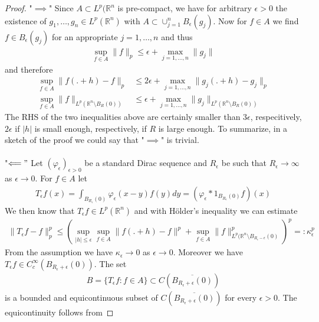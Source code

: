 \documentclass[11pt,a4paper]{article}
\theoremstyle{definition}
\begin{document}
\begin{proof}
"$\implies$" Since $A \subset L^p( \mathbb{R}^n$ is pre-compact, we have for arbitrary $\epsilon >0$ the existence of $g_1, \dots , g_n \in L^p( \mathbb{R}^n)$ with $A \subset \cup_{j=1}^n B_\epsilon (g_j).$ Now for $f \in A$ we find $f \in B_\epsilon(g_j)$ for an appropriate $j=1, \dots , n$ and thus 
\begin{align*}
\sup_{f \in A} \| f\|_p \leq \epsilon + \max_{j=1, \dots ,n} \| g_j\|
\end{align*}
and therefore 
\begin{align*}
\sup_{f \in A} \| f(. + h )-f \|_p &\leq 2 \epsilon + \max_{j=1, \dots , n} \|g_j(. + h) -g_j\|_p \\
\sup_{f \in A} \| f\|_{L^p( \mathbb{R}^n \setminus B_R(0))} & \leq \epsilon + \max_{j=1, \dots , n} \|g_j\|_{L^p( \mathbb{R}^n \setminus B_R(0))}
\end{align*}
The RHS of the two inequalities above are certainly smaller than $3 \epsilon$, respecitively, $2 \epsilon$ if $|h|$ is small enough, respectively, if $R$ is large enough. To summarize, in a sketch of the proof we could say that "$\implies$" is trivial. 
\\\\
"$\Longleftarrow"$ Let $(\varphi_\epsilon)_{\epsilon >0}$ be a standard Dirac sequence and $R_\epsilon$ be such that $R_\epsilon \to \infty$ as $\epsilon \to 0$. For $f \in A$ let 
\begin{align*}
T_\epsilon f(x) = \int_{B_{R_\epsilon}(0)} \varphi_\epsilon (x-y)f(y)dy =( \varphi_ \epsilon * 1_{B_{R_\epsilon}(0)}f)(x)
\end{align*}
We then know that $T_\epsilon f \in L^p( \mathbb{R}^n)$ and with Hölder's inequality we can estimate 
\begin{align*}
\|T_ \epsilon f -f \|_p^p \leq \left( \sup_{|h| \leq \epsilon} \sup_{f \in A} \| f ( . + h)-f\|^p + \sup_{f \in A} \|f\|^p_{L^p( \mathbb{R}^n \setminus B_{R_\epsilon - \epsilon} (0)} \right)^p =: \kappa_\epsilon^p
\end{align*}
From the assumption we have $\kappa_\epsilon \to 0$ as $\epsilon \to 0$. Moreover we have $T_\epsilon f \in C_c^\infty ( B_{R_\epsilon + \epsilon}(0))$. The set 
\begin{align*}
B= \lbrace T_ \epsilon f : f \in A \rbrace \subset C( \overline{B_{R_\epsilon +\epsilon}(0)})
\end{align*}
is a bounded and equicontinuous subset of $C( \overline{B_{R_\epsilon +\epsilon}(0)})$ for every $\epsilon >0$. The equicontinuity follows from 

\end{proof}
\end{document}
